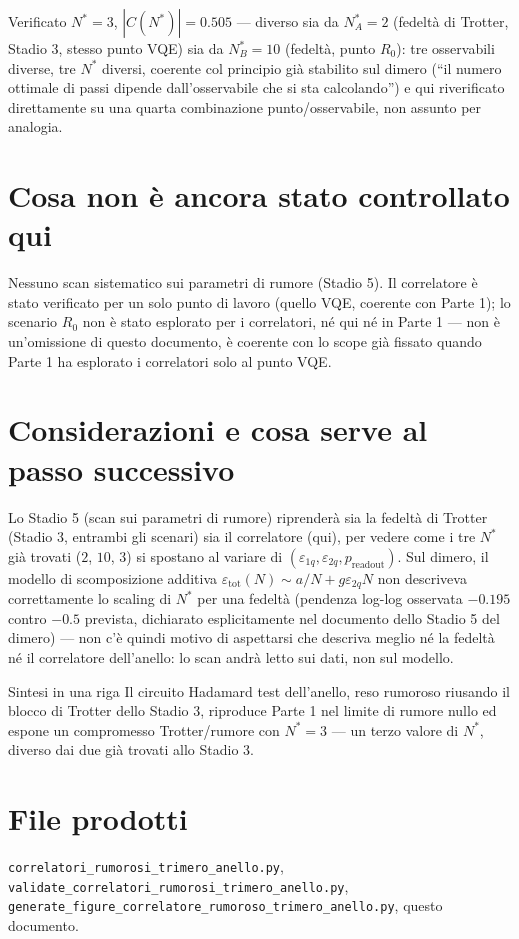 \documentclass[11pt,a4paper]{article}
\begin{document}
\begin{okbox}{Verificato}
$N^*=3$, $|C(N^*)|=0.505$ --- diverso sia da $N^*_A=2$ (fedeltà di
Trotter, Stadio 3, stesso punto VQE) sia da $N^*_B=10$ (fedeltà, punto
$R_0$): tre osservabili diverse, tre $N^*$ diversi, coerente col
principio già stabilito sul dimero (``il numero ottimale di passi
dipende dall'osservabile che si sta calcolando'') e qui riverificato
direttamente su una quarta combinazione punto/osservabile, non assunto
per analogia.
\end{okbox}

\section{Cosa non è ancora stato controllato qui}

Nessuno scan sistematico sui parametri di rumore (Stadio 5). Il
correlatore è stato verificato per un solo punto di lavoro (quello VQE,
coerente con Parte 1); lo scenario $R_0$ non è stato esplorato per i
correlatori, né qui né in Parte 1 --- non è un'omissione di questo
documento, è coerente con lo scope già fissato quando Parte 1 ha
esplorato i correlatori solo al punto VQE.

\section{Considerazioni e cosa serve al passo successivo}

Lo Stadio 5 (scan sui parametri di rumore) riprenderà sia la fedeltà di
Trotter (Stadio 3, entrambi gli scenari) sia il correlatore (qui), per
vedere come i tre $N^*$ già trovati ($2$, $10$, $3$) si spostano al
variare di $(\varepsilon_{1q},\varepsilon_{2q},p_\text{readout})$. Sul
dimero, il modello di scomposizione additiva
$\varepsilon_\text{tot}(N)\sim a/N+g\varepsilon_{2q}N$ non descriveva
correttamente lo scaling di $N^*$ per una fedeltà (pendenza log-log
osservata $-0.195$ contro $-0.5$ prevista, dichiarato esplicitamente nel
documento dello Stadio 5 del dimero) --- non c'è quindi motivo di
aspettarsi che descriva meglio né la fedeltà né il correlatore
dell'anello: lo scan andrà letto sui dati, non sul modello.

\begin{okbox}{Sintesi in una riga}
Il circuito Hadamard test dell'anello, reso rumoroso riusando il blocco
di Trotter dello Stadio 3, riproduce Parte 1 nel limite di rumore nullo
ed espone un compromesso Trotter/rumore con $N^*=3$ --- un terzo valore
di $N^*$, diverso dai due già trovati allo Stadio 3.
\end{okbox}

\section*{File prodotti}

\texttt{correlatori\_\allowbreak rumorosi\_trimero\_anello.py},
\texttt{validate\_\allowbreak correlatori\_\allowbreak rumorosi\_trimero\_anello.py},
\texttt{generate\_figure\_\allowbreak correlatore\_\allowbreak rumoroso\_trimero\_anello.py},
questo documento.
\end{document}
